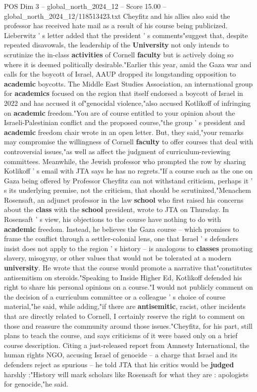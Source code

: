 \begin{textsample}{POS Dim 3 – global\_north\_2024\_12 – Score 15.00 – global\_north\_2024\_12/118513423.txt}
Cheyfitz and his allies also said the professor has received hate mail as a result of his course being publicized.
Lieberwitz ' s letter added that the president ' s comments"suggest that, despite repeated disavowals, the leadership of the \textbf{University} not only intends to scrutinize the in-class \textbf{activities} of Cornell \textbf{faculty} but is actively doing so where it is deemed politically desirable."Earlier this year, amid the Gaza war and calls for the boycott of Israel, AAUP dropped its longstanding opposition to \textbf{academic} boycotts.
The Middle East Studies Association, an international group for \textbf{academics} focused on the region that itself endorsed a boycott of Israel in 2022 and has accused it of"genocidal violence,"also accused Kotlikoff of infringing on \textbf{academic} freedom."You are of course entitled to your opinion about the Israeli-Palestinian conflict and the proposed course,"the group ' s president and \textbf{academic} freedom chair wrote in an open letter.
But, they said,"your remarks may compromise the willingness of Cornell \textbf{faculty} to offer courses that deal with controversial issues,"as well as affect the judgment of curriculum-reviewing committees.
Meanwhile, the Jewish professor who prompted the row by sharing Kotlikoff ' s email with JTA says he has no regrets."If a course such as the one on Gaza being offered by Professor Cheyfitz can not withstand criticism, perhaps it ' s its underlying premise, not the criticism, that should be scrutinized,"Menachem Rosensaft, an adjunct professor in the law \textbf{school} who first raised his concerns about the \textbf{class} with the \textbf{school} president, wrote to JTA on Thursday.
In Rosensaft ' s view, his objections to the course have nothing to do with \textbf{academic} freedom.
Instead, he believes the Gaza course -- which promises to frame the conflict through a settler-colonial lens, one that Israel ' s defenders insist does not apply to the region ' s history -- is analogous to \textbf{classes} promoting slavery, misogyny, or other values that would not be tolerated at a modern \textbf{university}.
He wrote that the course would promote a narrative that"constitutes antisemitism on steroids."Speaking to Inside Higher Ed, Kotlikoff defended his right to share his personal opinions on a course."I would not publicly comment on the decision of a curriculum committee or a colleague ' s choice of course material,"he said, while adding,"if there are \textbf{antisemitic}, racist, other incidents that are directly related to Cornell, I certainly reserve the right to comment on those and reassure the community around those issues."Cheyfitz, for his part, still plans to teach the course, and says criticisms of it were based only on a brief course description.
Citing a just-released report from Amnesty International, the human rights NGO, accusing Israel of genocide -- a charge that Israel and its defenders reject as spurious -- he told JTA that his critics would be \textbf{judged} harshly :"History will mark scholars like Rosensaft for what they are : apologists for genocide,"he said.


\end{textsample}
